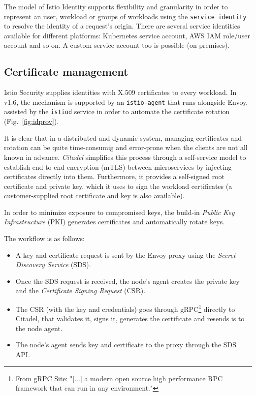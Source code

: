 The model of Istio Identity supports flexibility and granularity in order to represent an user, workload or groups of workloads using the \texttt{service identity} to resolve the identity of a request's origin.
There are several service identities available for different platforms: Kubernetes service account, AWS IAM role/user account and so on. A custom service account too is possible (on-premises).
\vspace{0.5cm}

\subsection{Certificate management}
Istio Security supplies identities with X.509 certificates to every workload. In v1.6, the mechanism is supported by an \texttt{istio-agent} that runs alongside Envoy, assisted by the \texttt{istiod} service in order to automate the certificate rotation (Fig.~\ref{fig:idprov}).

It is clear that in a distributed and dynamic system, managing certificates and rotation can be quite time-consumig and error-prone when the clients are not all known in advance. \textit{Citadel} simplifies this process through a self-service model to establish end-to-end encryption (mTLS) between microservices by injecting certificates directly into them. Furthermore, it provides a self-signed root certificate and private key, which it uses to sign the workload certificates (a customer-supplied root certificate and key is also available).

In order to minimize exposure to compromised keys, the build-in \textit{Public Key Infrastructure} (PKI) generates certificates and automatically rotate keys.

\noindent The workflow is as follows:

\begin{itemize}
    \item[1.] A key and certificate request is sent by the Envoy proxy using the \textit{Secret Discovery Service} (SDS).
    \item[2.] Once the SDS request is received, the node's agent creates the private key and the \textit{Certificate Signing Request} (CSR).
    \item[3.] The CSR (with the key and credentials) goes through gRPC\footnote{From \href{https://grpc.io/}{gRPC Site}: "[...] a modern open source high performance RPC framework that can run in any environment."} directly to Citadel, that validates it, signs it, generates the certificate and resends is to the node agent.
    \item[4.] The node's agent sends key and certificate to the proxy through the SDS API. 
\end{itemize}

